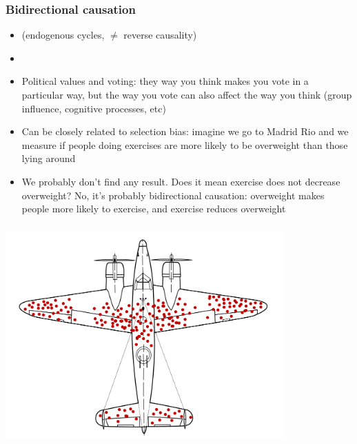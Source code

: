 \documentclass[aspectratio=43]{beamer}
\begin{document}
\begin{frame}
\frametitle{Bidirectional causation}
\centering


\begin{itemize}
  \item (endogenous cycles, $\neq$ reverse causality)
  \item[]
  \item Political values and voting: they way you think makes you vote in a particular way, but the way you vote can also affect the way you think (group influence, cognitive processes, etc)
  \item Can be closely related to selection bias: imagine we go to Madrid Rio and we measure if people doing exercises are more likely to be overweight than those lying around
  \item We probably don't find any result. Does it mean exercise does not decrease overweight? No, it's probably bidirectional causation: overweight makes people more likely to exercise, and exercise reduces overweight
\end{itemize}

\end{frame}

\begin{frame}
\frametitle{}
\centering

\includegraphics[width = 0.8\textwidth]{../img/Survivorship-bias}

\end{frame}
\end{document}
